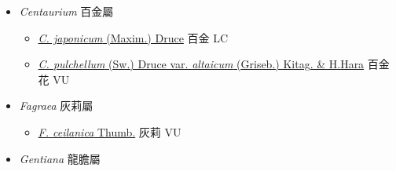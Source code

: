 
  \begin{itemize}
 \item[] \textit{Centaurium} 百金屬
                                
  \begin{itemize}
        \item[] \href{http://www.theplantlist.org/tpl1.1/search?q=Centaurium+japonicum}{\textit{C. japonicum} (Maxim.) Druce}   百金   LC
        \item[] \href{http://www.theplantlist.org/tpl1.1/search?q=Centaurium+pulchellum+var.+altaicum}{\textit{C. pulchellum} (Sw.) Druce var. \textit{altaicum} (Griseb.) Kitag. \& H.Hara}   百金花   VU
  \end{itemize}
 \item[] \textit{Fagraea} 灰莉屬
                                
  \begin{itemize}
        \item[] \href{http://www.theplantlist.org/tpl1.1/search?q=Fagraea+ceilanica}{\textit{F. ceilanica} Thumb.}   灰莉   VU
  \end{itemize}
 \item[] \textit{Gentiana} 龍膽屬
                                

\end{itemize}
